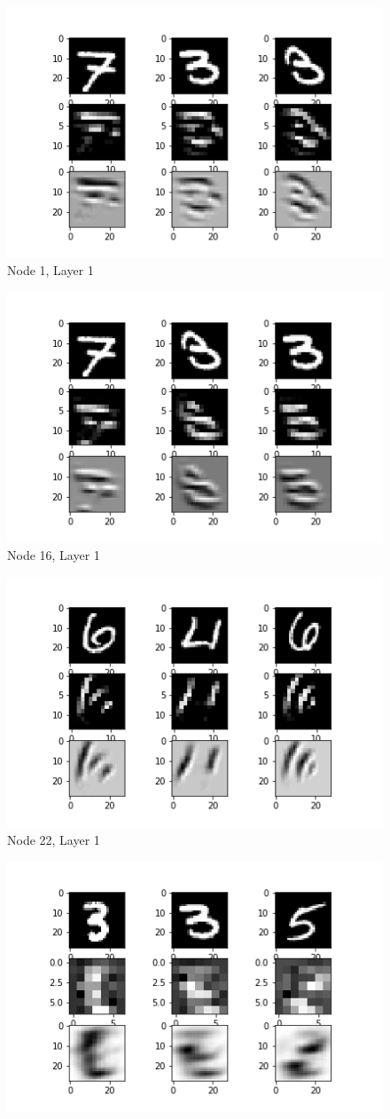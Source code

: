 \documentclass[12pt]{article}
\begin{document}
\begin{center}
	\begin{figure}[H]
		\centering
		\includegraphics[width=0.6\linewidth]{../diagrams/node1_layer1_mnist}
		\caption{Node 1, Layer 1}
		\label{fig:node1layer1mnist}
	\end{figure}
	\begin{figure}[H]
		\centering
		\includegraphics[width=0.6\linewidth]{../diagrams/node16_layer1_mnist}
		\caption{Node 16, Layer 1}
		\label{fig:node16layer1mnist}
	\end{figure}
	\pagebreak
	\begin{figure}[H]
		\centering
		\includegraphics[width=0.6\linewidth]{../diagrams/node22_layer1_mnist}
		\caption{Node 22, Layer 1}
		\label{fig:node22layer1mnist}
	\end{figure}
		\begin{figure}[H]
			\centering
			\includegraphics[width=0.6\linewidth]{../diagrams/node3_layer2_mnist}

\end{figure}
\end{center}
\end{document}
